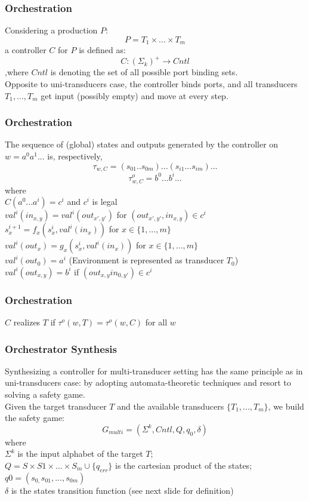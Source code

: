 \documentclass{beamer}
\theoremstyle{definition}
\theoremstyle{plain}
\begin{document}
\begin{frame}
\frametitle{Orchestration}
Considering a production $P$:
$$P = T_{1} \times . . . \times T_{m}$$
a controller $C$ for $P$ is defined as:
$$C : (\Sigma_{k})^{+} \to Cntl$$
,where $Cntl$ is denoting the set of all possible port binding sets.\\
Opposite to uni-transducers case, the controller binds ports, and all transducers $T_{1}, . . . , T_{m}$ get input (possibly empty) and move at every step.
\end{frame}

\begin{frame}
\frametitle{Orchestration}
The sequence of (global) states and outputs generated by the controller on $w = a^{0}a^{1}. . . $ is, respectively,
$$\tau_{w,C} = (s_{01} . . s_{0m}) . . . (s_{i1} . . . s_{im}) . . . $$
$$\tau^{o}_{w,C} = b^{0} . . . b^{i} . . .$$
where\\
$C(a^{0} . . . a^{i}) = c^{i}$ and $c^{i}$ is legal \\
$val^{i}(in_{x,y}) = val^{i}(out_{x',y'})$ for $ (out_{x', y'}, in_{x, y}) \in c^{i}$\\
$s^{i+1}_{x} = f_{x}(s^{i}_{x}, val^{i}(in_{x}))$ for $ x \in \{1, . . . ,m\}$\\
$val^{i}(out_{x}) = g_{x}(s^{i}_{x}, val^{i}(in_{x}))$ for $ x \in \{1, . . . ,m\}$\\
$val^{i}(out_{0}) = a^{i}$ (Environment is represented as transducer $T_{0}$)\\
$val^{i}(out_{x,y}) = b^{i}$ if $(out_{x,y} in_{0,y'}) \in c^{i}$
\end{frame}

\begin{frame}
\frametitle{Orchestration}
$C$ realizes $T$ if $\tau^{o}(w, T) = \tau^{o}(w, C)$ for all $w$
\end{frame}

\begin{frame}
\frametitle{Orchestrator Synthesis}
Synthesizing a controller for multi-transducer setting has the same principle as in uni-transducers case:  by adopting automata-theoretic techniques and resort to solving a safety game.\\
Given the target transducer $T$ and the available transducers $\{T_{1}, . . . ,T_{m}\}$, we build the safety
game:
$$G_{multi} = (\Sigma^{k}, Cntl, Q, q_{0}, \delta)$$
where\\
$\Sigma^{k}$ is the input alphabet of the target $T$;\\
$Q = S \times S1\times . . . \times S_{m} \cup \{q_{err}\}$ is the cartesian product of the states;\\
$q0 = (s_{0,} s_{01}, . . . , s_{0m})$\\
$\delta$ is the states transition function (see next slide for definition)
\end{frame}
\end{document}

